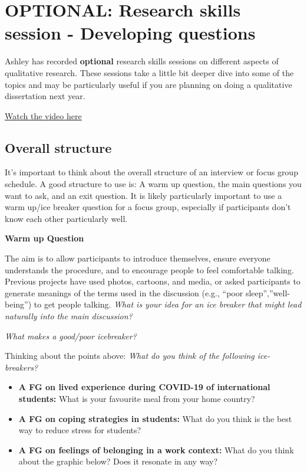 \documentclass[
  english,
  letterpaper,
  DIV=11,
  numbers=noendperiod]{scrreprt}
\providecommand{\tightlist}{%
  \setlength{\itemsep}{0pt}\setlength{\parskip}{0pt}}
\begin{document}
\section{OPTIONAL: Research skills session - Developing
questions}\label{optional-research-skills-session---developing-questions}

Ashley has recorded \textbf{optional} research skills sessions on
different aspects of qualitative research. These sessions take a little
bit deeper dive into some of the topics and may be particularly useful
if you are planning on doing a qualitative dissertation next year.

\href{https://echo360.org.uk/media/56e4abb3-e58c-4560-897b-18d2eeb91833/public?autoplay=false&automute=false&startTimeMillis=0}{Watch
the video here}

\subsection{Overall structure}\label{overall-structure}

It's important to think about the overall structure of an interview or
focus group schedule. A good structure to use is: A warm up question,
the main questions you want to ask, and an exit question. It is likely
particularly important to use a warm up/ice breaker question for a focus
group, especially if participants don't know each other particularly
well.

\textbf{Warm up Question}

The aim is to allow participants to introduce themselves, ensure
everyone understands the procedure, and to encourage people to feel
comfortable talking. Previous projects have used photos, cartoons, and
media, or asked participants to generate meanings of the terms used in
the discussion (e.g., ``poor sleep'',''well-being'') to get people
talking. \emph{What is your idea for an ice breaker that might lead
naturally into the main discussion?}

\emph{What makes a good/poor icebreaker?}

Thinking about the points above: \emph{What do you think of the
following ice-breakers?}

\begin{itemize}
\tightlist
\item
  \textbf{A FG on lived experience during COVID-19 of international
  students:} What is your favourite meal from your home country?
\item
  \textbf{A FG on coping strategies in students:} What do you think is
  the best way to reduce stress for students?
\item
  \textbf{A FG on feelings of belonging in a work context:} What do you
  think about the graphic below? Does it resonate in any way?
\end{itemize}
\end{document}
